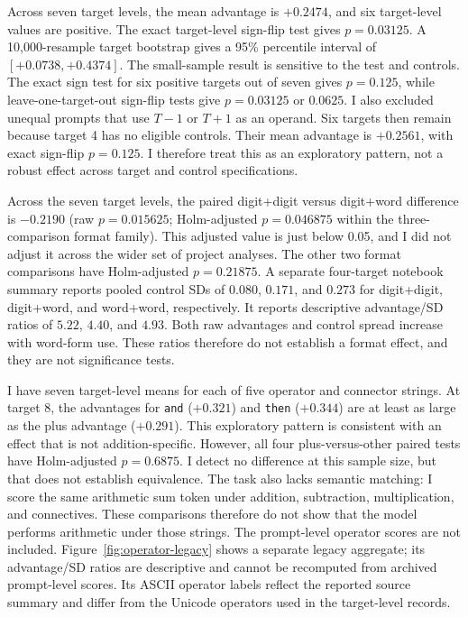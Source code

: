 \documentclass[11pt]{article}
\begin{document}
Across seven target levels, the mean advantage is $+0.2474$, and six target-level values are positive. The exact target-level sign-flip test gives $p=0.03125$. A 10,000-resample target bootstrap gives a 95\% percentile interval of $[+0.0738,+0.4374]$. The small-sample result is sensitive to the test and controls. The exact sign test for six positive targets out of seven gives $p=0.125$, while leave-one-target-out sign-flip tests give $p=0.03125$ or $0.0625$. I also excluded unequal prompts that use $T-1$ or $T+1$ as an operand. Six targets then remain because target 4 has no eligible controls. Their mean advantage is $+0.2561$, with exact sign-flip $p=0.125$. I therefore treat this as an exploratory pattern, not a robust effect across target and control specifications.

Across the seven target levels, the paired digit+digit versus digit+word difference is $-0.2190$ (raw $p=0.015625$; Holm-adjusted $p=0.046875$ within the three-comparison format family). This adjusted value is just below 0.05, and I did not adjust it across the wider set of project analyses. The other two format comparisons have Holm-adjusted $p=0.21875$. A separate four-target notebook summary reports pooled control SDs of $0.080$, $0.171$, and $0.273$ for digit+digit, digit+word, and word+word, respectively. It reports descriptive advantage/SD ratios of $5.22$, $4.40$, and $4.93$. Both raw advantages and control spread increase with word-form use. These ratios therefore do not establish a format effect, and they are not significance tests.

I have seven target-level means for each of five operator and connector strings. At target 8, the advantages for \texttt{and} ($+0.321$) and \texttt{then} ($+0.344$) are at least as large as the plus advantage ($+0.291$). This exploratory pattern is consistent with an effect that is not addition-specific. However, all four plus-versus-other paired tests have Holm-adjusted $p=0.6875$. I detect no difference at this sample size, but that does not establish equivalence. The task also lacks semantic matching: I score the same arithmetic sum token under addition, subtraction, multiplication, and connectives. These comparisons therefore do not show that the model performs arithmetic under those strings. The prompt-level operator scores are not included. Figure~\ref{fig:operator-legacy} shows a separate legacy aggregate; its advantage/SD ratios are descriptive and cannot be recomputed from archived prompt-level scores. Its ASCII operator labels reflect the reported source summary and differ from the Unicode operators used in the target-level records.
\end{document}
